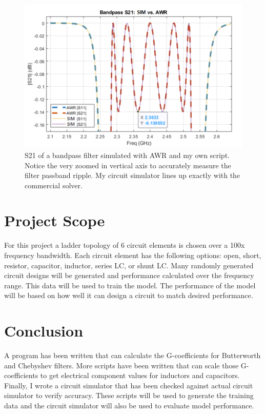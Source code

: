 \documentclass[10pt,conference]{IEEEtran}
\begin{document}
\begin{figure}
	\centering
	\includegraphics[width=0.9\linewidth]{Figures/MATLAB_vs_AWR_2.png}
	\caption{S21 of a bandpass filter simulated with AWR and my own script. Notice the very zoomed in vertical axis to accurately measure the filter passband ripple. My circuit simulator lines up exactly with the commercial solver.}
	\label{MATLAB_vs_AWR_2}
\end{figure}



\section{Project Scope}


For this project a ladder topology of 6 circuit elements is chosen over a 100x frequency bandwidth. Each circuit element has the following options: open, short, resistor, capacitor, inductor, series LC, or shunt LC. Many randomly generated circuit designs will be generated and performance calculated over the frequency range. This data will be used to train the model. The performance of the model will be based on how well it can design a circuit to match desired performance.











\section{Conclusion}
A program has been written that can calculate the G-coefficients for Butterworth and Chebyshev filters. More scripts have been written that can scale those G-coefficients to get electrical component values for inductors and capacitors. Finally, I wrote a circuit simulator that has been checked against actual circuit simulator to verify accuracy. These scripts will be used to generate the training data and the circuit simulator will also be used to evaluate model performance.










\end{document}

